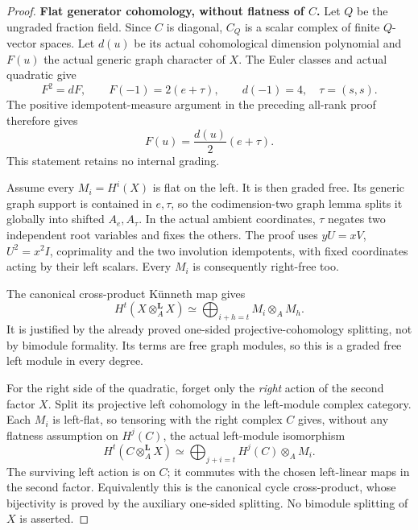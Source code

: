 \begin{proof}
\par\smallskip\noindent\textbf{Flat generator cohomology, without flatness of \(C\).}\quad
Let \(Q\) be the ungraded fraction field.
Since \(C\) is diagonal, \(C_Q\) is a scalar
complex of finite \(Q\)-vector spaces.
Let \(d(u)\) be its actual cohomological
dimension polynomial and \(F(u)\) the actual
generic graph character of \(X\).
The Euler classes and actual quadratic give
\[
 F^2=dF,\qquad F(-1)=2(e+\tau),\qquad d(-1)=4,
                  \quad\tau=(s,s).
\]
The positive idempotent-measure argument in the
preceding all-rank proof therefore gives
\begin{equation}\label{eq:centralCoefficientGenericGraphs}
                      F(u)=\frac{d(u)}2(e+\tau).
\end{equation}
This statement retains no internal grading.

Assume every \(M_i=H^i(X)\) is flat on the left.
It is then graded free. Its generic graph support
is contained in \(e,\tau\), so the codimension-two
graph lemma splits it globally into shifted
\(A_e,A_\tau\). In the actual ambient coordinates,
\(\tau\) negates two independent root variables
and fixes the others. The proof uses
\(yU=xV\), \(U^2=x^2I\), coprimality and the
two involution idempotents, with fixed coordinates
acting by their left scalars.
Every \(M_i\) is consequently right-free too.

The canonical cross-product K\"unneth map gives
\begin{equation}\label{eq:centralCoefficientFreeSquare}
 H^t(X\otimes_A^{\mathbf L}X)
       \simeq\bigoplus_{i+h=t}M_i\otimes_A M_h.
\end{equation}
It is justified by the already proved one-sided
projective-cohomology splitting, not by bimodule
formality. Its terms are free graph modules, so
this is a graded free left module in every degree.

For the right side of the quadratic, forget only
the \emph{right} action of the second factor \(X\).
Split its projective left cohomology in the
left-module complex category. Each \(M_i\) is
left-flat, so tensoring with the right complex
\(C\) gives, without any flatness assumption
on \(H^j(C)\), the actual left-module isomorphism
\begin{equation}\label{eq:centralCoefficientNonflatKunneth}
 H^t(C\otimes_A^{\mathbf L}X)
       \simeq\bigoplus_{j+i=t}H^j(C)\otimes_A M_i.
\end{equation}
The surviving left action is on \(C\); it
commutes with the chosen left-linear maps in
the second factor. Equivalently this is the
canonical cycle cross-product, whose bijectivity
is proved by the auxiliary one-sided splitting.
No bimodule splitting of \(X\) is asserted.


\end{proof}

